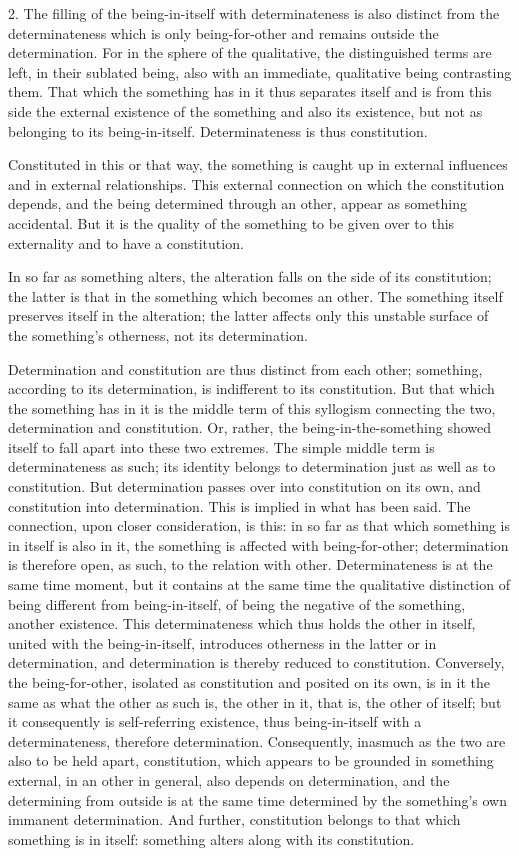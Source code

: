 2. The filling of the being-in-itself with determinateness
is also distinct from the determinateness
which is only being-for-other
and remains outside the determination.
For in the sphere of the qualitative,
the distinguished terms are left, in their sublated being,
also with an immediate, qualitative being contrasting them.
That which the something has in it thus separates itself
and is from this side the external existence of
the something and also its existence,
but not as belonging to its being-in-itself.
Determinateness is thus constitution.

Constituted in this or that way,
the something is caught up in external influences
and in external relationships.
This external connection on which the constitution depends,
and the being determined through an other,
appear as something accidental.
But it is the quality of the something
to be given over to this externality
and to have a constitution.

In so far as something alters,
the alteration falls on the side of its constitution;
the latter is that in the something which becomes an other.
The something itself preserves itself in the alteration;
the latter affects only this unstable surface
of the something's otherness, not its determination.

Determination and constitution are thus distinct from each other;
something, according to its determination,
is indifferent to its constitution.
But that which the something has in it is
the middle term of this syllogism connecting the two,
determination and constitution.
Or, rather, the being-in-the-something showed itself
to fall apart into these two extremes.
The simple middle term is determinateness as such;
its identity belongs to determination
just as well as to constitution.
But determination passes over into constitution on its own,
and constitution into determination.
This is implied in what has been said.
The connection, upon closer consideration, is this:
in so far as that which something is in itself is also in it,
the something is affected with being-for-other;
determination is therefore open, as such,
to the relation with other.
Determinateness is at the same time moment,
but it contains at the same time the qualitative distinction
of being different from being-in-itself,
of being the negative of the something,
another existence.
This determinateness which thus holds the other in itself,
united with the being-in-itself,
introduces otherness in the latter or in determination,
and determination is thereby reduced to constitution.
Conversely, the being-for-other, isolated as constitution
and posited on its own, is in it the same
as what the other as such is, the other in it,
that is, the other of itself;
but it consequently is self-referring existence,
thus being-in-itself with a determinateness, therefore determination.
Consequently, inasmuch as the two are also to be held apart,
constitution, which appears to be grounded in something external,
in an other in general, also depends on determination,
and the determining from outside is at the same time
determined by the something's own immanent determination.
And further, constitution belongs to that
which something is in itself:
something alters along with its constitution.

